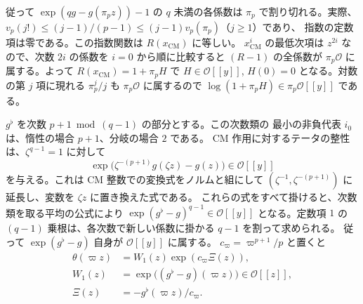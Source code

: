 従って \(\exp(qg-g(\pi_p z))-1\) の \(q\) 未満の各係数は
\(\pi_p\) で割り切れる。実際、
\(v_p(j!)\le(j-1)/(p-1)\le (j-1)v_p(\pi_p)\)（\(j\ge1\)）であり、
指数の定数項は零である。この指数関数は \(R(x_\mathrm{CM})\) に等しい。
\(x_\mathrm{CM}^i\) の最低次項は \(z^{2i}\) なので、次数 \(2i\) の係数を
\(i=0\) から順に比較すると \((R-1)\) の全係数が
\(\pi_p\mathcal O\) に属する。よって \(R(x_\mathrm{CM})=1+\pi_p H\) で
\(H\in\mathcal O[[y]]\), \(H(0)=0\) となる。対数の第 \(j\) 項に現れる
\(\pi_p^j/j\) も \(\pi_p\mathcal O\) に属するので
\(\log(1+\pi_p H)\in\pi_p\mathcal O[[y]]\) である。

\(g^\flat\) を次数 \(p+1\bmod(q-1)\) の部分とする。この次数類の
最小の非負代表 \(i_0\) は、惰性の場合 \(p+1\)、分岐の場合 \(2\) である。
CM 作用に対するテータの整性は、\(\zeta^{q-1}=1\) に対して
\[
 \exp\bigl(\zeta^{-(p+1)}g(\zeta z)-g(z)\bigr)\in\mathcal O[[y]]
\]
を与える。これは CM 整数での変換式をノルムと組にして
\((\zeta^{-1},\zeta^{-(p+1)})\) に延長し、変数を \(\zeta z\) に置き換えた式である。
これらの式をすべて掛けると、次数類を取る平均の公式により
\(\exp(g^\flat-g)^{q-1}\in\mathcal O[[y]]\) となる。定数項 \(1\) の
\((q-1)\) 乗根は、各次数で新しい係数に掛かる \(q-1\) を割って求められる。
従って \(\exp(g^\flat-g)\) 自身が \(\mathcal O[[y]]\) に属する。
\(c_\varpi=\varpi^{p+1}/p\) と置くと
\begin{equation}\label{eq:upper-one-variable}
 \begin{aligned}
 \theta(\varpi z)&=W_1(z)\exp(c_\varpi\Xi(z)),\\
 W_1(z)&=\exp\bigl((g^\flat-g)(\varpi z)\bigr)\in\mathcal O[[z]],\\
 \Xi(z)&=-g^\flat(\varpi z)/c_\varpi .
 \end{aligned}
\end{equation}

